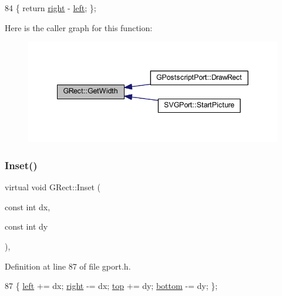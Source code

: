 \begin{DoxyCode}
84 \{ \textcolor{keywordflow}{return} \mbox{\hyperlink{class_g_rect_a361868c6c368e642abcaf3e4823b1e70}{right}} - \mbox{\hyperlink{class_g_rect_ab848c49d0c6376f749a592042791b98b}{left}}; \};
\end{DoxyCode}
Here is the caller graph for this function\+:\nopagebreak
\begin{figure}[H]
\begin{center}
\leavevmode
\includegraphics[width=342pt]{class_g_rect_af36a407452070f2e93a25dbafd3b4314_icgraph}
\end{center}
\end{figure}
\mbox{\label{class_g_rect_a3b9d11354aad699f297dbfa7eb8196aa}} 
\subsubsection{\texorpdfstring{Inset()}{Inset()}}
{\footnotesize\ttfamily virtual void G\+Rect\+::\+Inset (\begin{DoxyParamCaption}\item[{const int}]{dx,  }\item[{const int}]{dy }\end{DoxyParamCaption})\hspace{0.3cm}{\ttfamily [inline]}, {\ttfamily [virtual]}}



Definition at line 87 of file gport.\+h.


\begin{DoxyCode}
87 \{ \mbox{\hyperlink{class_g_rect_ab848c49d0c6376f749a592042791b98b}{left}} += dx; \mbox{\hyperlink{class_g_rect_a361868c6c368e642abcaf3e4823b1e70}{right}} -= dx; \mbox{\hyperlink{class_g_rect_af22c8a22a7d2fe0f139375e7eb171675}{top}} += dy; \mbox{\hyperlink{class_g_rect_a767f1eb55f7e9880f58609406b2d6a66}{bottom}} -= dy; \};
\end{DoxyCode}
\mbox{\label{class_g_rect_a7774fac9cd2ec8bee54a442e7ca18ebc}} 
